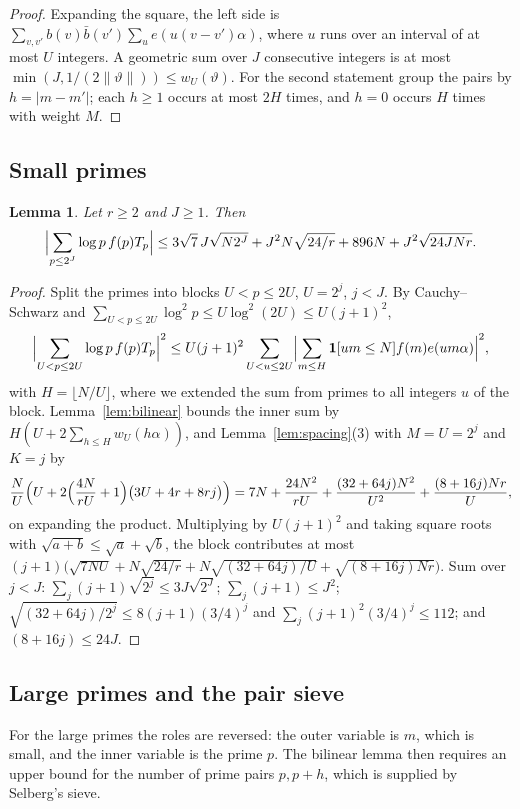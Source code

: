 \documentclass[11pt]{amsart}
\newtheorem{lemma}[theorem]{Lemma}
\theoremstyle{definition}
\theoremstyle{remark}
\numberwithin{equation}{section}
\newcommand{\e}{e}
\newcommand{\nint}[1]{\|#1\|}
\begin{document}
\begin{proof}
Expanding the square, the left side is
$\sum_{v,v'}b(v)\bar b(v')\sum_u\e(u(v-v')\alpha)$, where $u$ runs over an
interval of at most $U$ integers. A geometric sum over $J$ consecutive integers
is at most $\min(J,1/(2\nint\vartheta))\le w_U(\vartheta)$. For the second
statement group the pairs by $h=|m-m'|$; each $h\ge1$ occurs at most $2H$ times,
and $h=0$ occurs $H$ times with weight $M$.
\end{proof}

\subsection{Small primes}

\begin{lemma}\label{lem:small}
Let $r\ge2$ and $J\ge1$. Then
\[
\Bigl|\sum_{p\le2^J}\log p\,f(p)T_p\Bigr|\le3\sqrt7\,J\sqrt{N2^J}+J^2N\sqrt{24/r}+896N+J^2\sqrt{24JNr}.
\]
\end{lemma}

\begin{proof}
Split the primes into blocks $U<p\le2U$, $U=2^j$, $j<J$. By Cauchy--Schwarz and
$\sum_{U<p\le2U}\log^2p\le U\log^2(2U)\le U(j+1)^2$,
\[
\Bigl|\sum_{U<p\le2U}\log p\,f(p)T_p\Bigr|^2\le U(j+1)^2\sum_{U<u\le2U}\Bigl|\sum_{m\le
H}\mathbf 1[um\le N]f(m)\e(um\alpha)\Bigr|^2,
\]
with $H=\lfloor N/U\rfloor$, where we extended the sum from primes to all
integers $u$ of the block. Lemma~\ref{lem:bilinear} bounds the inner sum by
$H(U+2\sum_{h\le H}w_U(h\alpha))$, and Lemma~\ref{lem:spacing}(3) with $M=U=2^j$ and $K=j$ by
\[
\frac NU\Bigl(U+2\Bigl(\frac{4N}{rU}+1\Bigr)\bigl(3U+4r+8rj\bigr)\Bigr)=7N+\frac{24N^2}{rU}+\frac{(32+64j)N^2}{U^2}+\frac{(8+16j)Nr}U,
\]
on expanding the product. Multiplying by
$U(j+1)^2$ and taking square roots with $\sqrt{a+b}\le\sqrt a+\sqrt b$, the block
contributes at most
$(j+1)\bigl(\sqrt{7NU}+N\sqrt{24/r}+N\sqrt{(32+64j)/U}+\sqrt{(8+16j)Nr}\bigr)$.
Sum over $j<J$: $\sum_j(j+1)\sqrt{2^j}\le3J\sqrt{2^J}$; $\sum_j(j+1)\le J^2$;
$\sqrt{(32+64j)/2^j}\le8(j+1)(3/4)^j$ and $\sum_j(j+1)^2(3/4)^j\le112$; and
$(8+16j)\le24J$.
\end{proof}

\subsection{Large primes and the pair sieve}

For the large primes the roles are reversed: the outer variable is $m$, which
is small, and the inner variable is the prime $p$. The bilinear lemma then
requires an upper bound for the number of prime pairs $p,p+h$, which is
supplied by Selberg's sieve.
\end{document}

